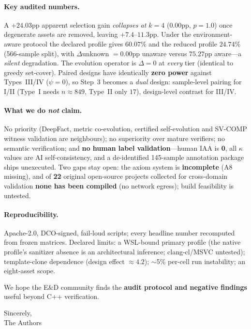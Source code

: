 \documentclass[11pt]{article}
\begin{document}
\paragraph{Key audited numbers.}
A $+24.03$pp apparent selection gain \emph{collapses at $k{=}4$} ($0.00$pp, $p{=}1.0$)
once degenerate assets are removed, leaving $+7.4$--$11.3$pp. Under the
environment-aware protocol the declared profile gives $60.07\%$ and the reduced profile
$24.74\%$ (566-sample split), with $\Delta$unknown $=0.00$pp unaware versus $75.27$pp
aware---a \emph{silent} degradation. The evolution operator is $\Delta{=}0$ at
\emph{every} tier (identical to greedy set-cover). Paired designs have identically
\textbf{zero power} against Types~III/IV ($\psi{=}0$), so Step~3 becomes a \emph{dual}
design: sample-level pairing for I/II (Type~I needs $n\approx849$, Type~II only $17$),
design-level contrast for III/IV.

\paragraph{What we do \emph{not} claim.}
No priority (DeepFact, metric co-evolution, certified self-evolution and SV-COMP witness
validation are neighbours); no superiority over mature verifiers; no semantic
verification; and \textbf{no human label validation}---human IAA is \textbf{0}, all
$\kappa$ values are AI self-consistency, and a de-identified 145-sample annotation package
ships unexecuted. Two gaps stay open: the axiom system is \textbf{incomplete} (A8
missing), and of \textbf{22} original open-source projects collected for cross-domain
validation \textbf{none has been compiled} (no network egress); build feasibility is
untested.

\paragraph{Reproducibility.}
Apache-2.0, DCO-signed, fail-loud scripts; every headline number recomputed from frozen
matrices. Declared limits: a WSL-bound primary profile (the native profile's sanitizer
absence is an architectural inference; clang-cl/MSVC untested); template-clone dependence
(design effect $\approx4.2$); $\sim$5\% per-cell run instability; an eight-asset scope.

\medskip
\noindent
We hope the E\&D community finds the \textbf{audit protocol and negative findings}
useful beyond C++ verification.

\bigskip
\noindent
Sincerely,\\
The Authors
\end{document}
